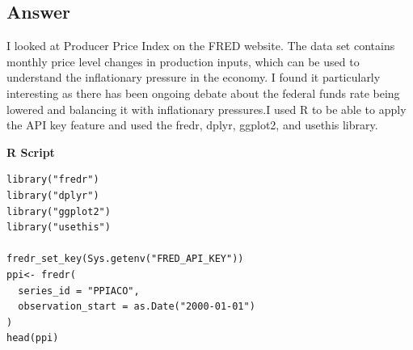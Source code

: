 \documentclass{article}
\begin{document}
\subsection*{Answer} I looked at Producer Price Index on the FRED website. The data set contains monthly price level changes in production inputs, which can be used to understand the inflationary pressure in the economy. I found it particularly interesting as there has been ongoing debate about the federal funds rate being lowered and balancing it with inflationary pressures.I used R to be able to apply the API key feature and used the fredr, dplyr, ggplot2, and usethis library. 

\vspace{0.5cm}
\textbf{R Script}
\begin{verbatim}
library("fredr")
library("dplyr")
library("ggplot2")
library("usethis")

fredr_set_key(Sys.getenv("FRED_API_KEY"))
ppi<- fredr(
  series_id = "PPIACO",
  observation_start = as.Date("2000-01-01")
)
head(ppi)

\end{verbatim}
\end{document}
